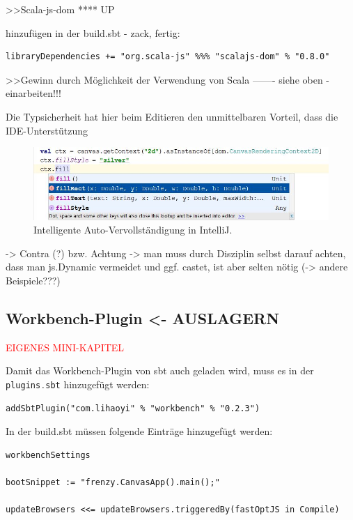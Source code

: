 \documentclass[a4paper, 12pt, hidelinks, listof=totoc, listoftables=totoc, bibliography=totoc]{scrreprt}
\newcommand{\code}[1]{\lstinline[language=Scala, style=inline]|#1|}
\newcommand{\TODO}[1]{\textcolor{red}{#1}\newline}
\begin{document}
>>Scala-js-dom       **** UP %

hinzufügen in der build.sbt - zack, fertig:

\begin{lstlisting}[style=snippet]
libraryDependencies += "org.scala-js" %%% "scalajs-dom" % "0.8.0"
\end{lstlisting}





>>Gewinn durch Möglichkeit der Verwendung von Scala  ------- siehe oben - einarbeiten!!!

Die Typsicherheit hat hier beim Editieren den unmittelbaren Vorteil, dass die \ac{IDE}-Unterstützung

\begin{figure}[!h]
    \centering
    \includegraphics[width=1.0\textwidth]{typesafe-autocomplete}
    \caption{Intelligente Auto-Vervollständigung in IntelliJ.}
    \label{fig:typesafe-autocomplete}
\end{figure}


	-> Contra (?) bzw. Achtung ->  man muss durch Disziplin selbst darauf achten, dass man js.Dynamic vermeidet und ggf. castet, ist aber selten nötig (-> andere Beispiele???)




\subsection{Workbench-Plugin <- AUSLAGERN}

\TODO{EIGENES MINI-KAPITEL}

Damit das Workbench-Plugin von sbt auch geladen wird, muss es in der \code{plugins.sbt} hinzugefügt werden:

\begin{lstlisting}[style=snippet]
addSbtPlugin("com.lihaoyi" % "workbench" % "0.2.3")
\end{lstlisting}

In der build.sbt müssen folgende Einträge hinzugefügt werden:
\begin{lstlisting}[style=snippet]
workbenchSettings

bootSnippet := "frenzy.CanvasApp().main();"

updateBrowsers <<= updateBrowsers.triggeredBy(fastOptJS in Compile)
\end{lstlisting}
\end{document}
